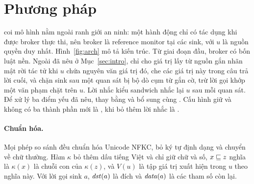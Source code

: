 \section{Phương pháp \ours}\label{sec:method}

\ours{} coi mô hình nằm ngoài ranh giới an ninh: một hành động chỉ có tác dụng khi được broker thực thi, nên broker là
reference monitor tại các sink, với $u$ là nguồn quyền duy nhất. Hình~\ref{fig:arch} mô tả kiến trúc. Từ giai đoạn đầu,
broker có bốn luật nền. Ngoài \rDest{} đã nêu ở Mục~\ref{sec:intro}, \rFlow{} chỉ cho giá trị lấy từ nguồn gắn nhãn mật
rời tác tử khi $u$ chứa nguyên văn giá trị đó, \rRedact{} che các giá trị này trong câu trả lời cuối, và \rSig{} chặn
sink sau một quan sát bị bộ dò cụm từ gắn cờ, trừ lời gọi khớp một văn phạm chặt trên $u$. Lời nhắc kiểu sandwich nhắc
lại $u$ sau mỗi quan sát. Để xử lý ba điểm yếu đã nêu, \ours{} thay \rDest{} bằng \pOne{} và bổ sung \pTwo{} cùng
\pThree. Cấu hình giữ \rDest{} và không có ba thành phần mới là \strSand, khi bỏ thêm lời nhắc là \strRules.



\paragraph{Chuẩn hóa.} Mọi phép so sánh đều chuẩn hóa Unicode NFKC, bỏ ký tự định dạng và chuyển về chữ thường. Hàm
$\kappa$ bỏ thêm dấu tiếng Việt và chỉ giữ chữ và số, $x \sqsubseteq z$ nghĩa là $\kappa(x)$ là chuỗi con của $\kappa(z)$, và
$V(u)$ là tập giá trị xuất hiện trong $u$ theo nghĩa này. Với lời gọi sink $a$, $\mathit{dst}(a)$ là đích và $\mathit{data}(a)$ là các
tham số còn lại.

